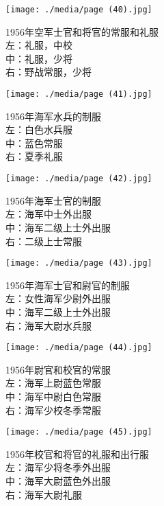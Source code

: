 \begin{figure}
    \texttt{[image: ./media/page (40).jpg]}
    \caption{1956年空军士官和将官的常服和礼服\\左：礼服，中校\\中：礼服，少将\\右：野战常服，少将}
\end{figure}

\begin{figure}
    \texttt{[image: ./media/page (41).jpg]}
    \caption{1956年海军水兵的制服\\左：白色水兵服\\中：蓝色常服\\右：夏季礼服}
\end{figure}

\begin{figure}
    \texttt{[image: ./media/page (42).jpg]}
    \caption{1956年海军士官的制服\\左：海军中士外出服\\中：海军二级上士外出服\\右：二级上士常服}
\end{figure}

\begin{figure}
    \texttt{[image: ./media/page (43).jpg]}
    \caption{1956年海军士官和尉官的制服\\左：女性海军少尉外出服\\中：海军二级上士外出服\\右：海军大尉水兵服}
\end{figure}

\begin{figure}
    \texttt{[image: ./media/page (44).jpg]}
    \caption{1956年尉官和校官的常服\\左：海军上尉蓝色常服\\中：海军中尉白色常服\\右：海军少校冬季常服}
\end{figure}

\begin{figure}
    \texttt{[image: ./media/page (45).jpg]}
    \caption{1956年校官和将官的礼服和出行服\\左：海军少将冬季外出服\\中：海军大尉蓝色外出服\\右：海军大尉礼服}
\end{figure}


